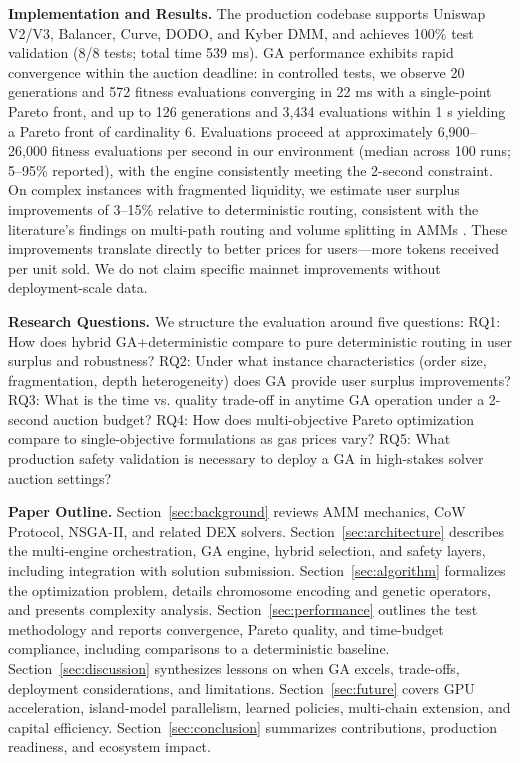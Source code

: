 \documentclass[11pt]{article}
\newcommand{\1}{\mathbf{1}}  %
\begin{document}
\textbf{Implementation and Results.} The production codebase supports Uniswap V2/V3, Balancer, Curve, DODO, and Kyber DMM, and achieves 100\% test validation (8/8 tests; total time 539 ms). GA performance exhibits rapid convergence within the auction deadline: in controlled tests, we observe 20 generations and 572 fitness evaluations converging in 22 ms with a single-point Pareto front, and up to 126 generations and 3{,}434 evaluations within 1 s yielding a Pareto front of cardinality 6. Evaluations proceed at approximately 6{,}900--26{,}000 fitness evaluations per second in our environment (median across 100 runs; 5--95\% reported), with the engine consistently meeting the 2-second constraint. On complex instances with fragmented liquidity, we estimate user surplus improvements of 3--15\% relative to deterministic routing, consistent with the literature's findings on multi-path routing and volume splitting in AMMs \cite{angeris2020improved,lu2021myth,zhang2022path}. These improvements translate directly to better prices for users---more tokens received per unit sold. We do not claim specific mainnet improvements without deployment-scale data.

\textbf{Research Questions.} We structure the evaluation around five questions: RQ1: How does hybrid GA+deterministic compare to pure deterministic routing in user surplus and robustness? RQ2: Under what instance characteristics (order size, fragmentation, depth heterogeneity) does GA provide user surplus improvements? RQ3: What is the time vs. quality trade-off in anytime GA operation under a 2-second auction budget? RQ4: How does multi-objective Pareto optimization compare to single-objective formulations as gas prices vary? RQ5: What production safety validation is necessary to deploy a GA in high-stakes solver auction settings?

\textbf{Paper Outline.} Section~\ref{sec:background} reviews AMM mechanics, CoW Protocol, NSGA-II, and related DEX solvers. Section~\ref{sec:architecture} describes the multi-engine orchestration, GA engine, hybrid selection, and safety layers, including integration with solution submission. Section~\ref{sec:algorithm} formalizes the optimization problem, details chromosome encoding and genetic operators, and presents complexity analysis. Section~\ref{sec:performance} outlines the test methodology and reports convergence, Pareto quality, and time-budget compliance, including comparisons to a deterministic baseline. Section~\ref{sec:discussion} synthesizes lessons on when GA excels, trade-offs, deployment considerations, and limitations. Section~\ref{sec:future} covers GPU acceleration, island-model parallelism, learned policies, multi-chain extension, and capital efficiency. Section~\ref{sec:conclusion} summarizes contributions, production readiness, and ecosystem impact.
\end{document}
